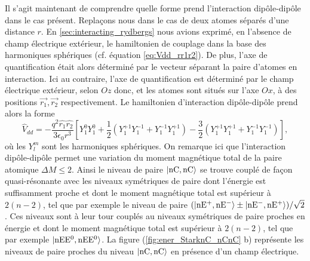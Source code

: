 Il s'agit maintenant de comprendre quelle forme prend l'interaction dipôle-dipôle dans le cas présent.
Replaçons nous dans le cas de deux atomes séparés d'une distance $r$.
En \ref{sec:interacting_rydbergs} nous avions exprimé, en l'absence de champ électrique extérieur, le hamiltonien de couplage dans la base des harmoniques sphériques (cf. équation \eqref{eq:Vdd_rr1r2}).
De plus, l'axe de quantification était alors déterminé par le vecteur séparant la paire d'atomes en interaction.
Ici au contraire, l'axe de quantification est déterminé par le champ électrique extérieur, selon $Oz$ donc, et les atomes sont situés sur l'axe $Ox$, à des positions $\vec{r_1},\vec{r_2}$ respectivement.
Le hamiltonien d'interaction dipôle-dipôle prend alors la forme
\begin{equation}
\label{eq:dipdip_nC}
\hat{V}_{dd} = -\frac{q^2\hat{r_1} \hat{r_2}}{3\epsilon_0 r^3}
\left[ Y_1^0 Y_1^0 + \frac{1}{2} \left( Y_1^{+1}Y_1^{-1} + Y_1^{-1}Y_1^{+1} \right)
- \frac{3}{2} \left(  Y_1^{+1}Y_1^{+1} + Y_1^{-1}Y_1^{-1} \right) \right],
\end{equation}
où les $Y_l^m$ sont les harmoniques sphériques.
On remarque ici que l'interaction dipôle-dipôle permet une variation du moment magnétique total de la paire atomique $\Delta M \leq 2$.
Ainsi le niveau de paire $\ket{\mathrm{nC},\mathrm{nC}}$ se trouve couplé de façon quasi-résonante avec les niveaux symétriques de paire dont l'énergie est suffisamment proche et dont le moment magnétique total est supérieur  à $2(n-2)$, tel que par exemple le niveau de paire $(\ket{\mathrm{nE^+},\mathrm{nE^-}}\pm\ket{\mathrm{nE^-},\mathrm{nE^+}})/\sqrt{2}$.
Ces niveaux sont à leur tour couplés au niveaux symétriques de paire proches en énergie et dont le moment magnétique total est supérieur à $2(n-2)$, tel que par exemple $\ket{\mathrm{nEE^0},\mathrm{nEE^0}}$.
La figure (\ref{fig:ener_StarknC_nCnC} b) représente les niveaux de paire proches du niveau $\ket{\mathrm{nC},\mathrm{nC}}$ en présence d'un champ électrique.

